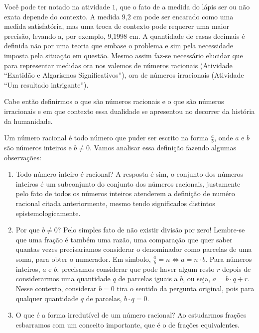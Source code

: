 Você pode ter notado na atividade $1$, que o fato de a medida do lápis ser ou não exata depende do contexto. A medida $9\text{,}2$ cm pode ser encarado como uma medida satisfatória, mas uma troca de contexto pode requerer uma maior precisão, levando a, por exemplo, $9\text{,}1998$ cm. A quantidade de casas decimais é definida não por uma teoria que embase o problema e sim pela necessidade imposta pela situação em questão. Mesmo assim faz-se necessário elucidar que para representar medidas ora nos valemos de números racionais (Atividade “Exatidão e Algarismos Significativos”), ora de números irracionais (Atividade “Um resultado intrigante”).

Cabe então definirmos o que são números racionais e o que são números irracionais e em que contexto essa dualidade se apresentou no decorrer da história da humanidade.

Um número racional é todo número que puder ser escrito na forma $\displaystyle\frac{a}{b}$, onde $a$ e $b$ são números inteiros e $b \neq 0$. Vamos analisar essa definição fazendo algumas observações:
\begin{enumerate}
\item {} 
Todo número inteiro é racional? A resposta é sim, o conjunto dos números inteiros é um subconjunto do conjunto dos números racionais, justamente pelo fato de todos os números inteiros atenderem a definição de numéro racional citada anteriormente, mesmo tendo significados distintos epistemologicamente.

\item {} 
Por que $b \neq 0$?  Pelo simples fato de não existir divisão por zero! Lembre-se que uma fração é também uma razão, uma comparação que quer saber quantas vezes precisaríamos considerar o denominador como parcelas de uma soma, para obter o numerador. Em símbolo, $\displaystyle\frac{a}{b}=n \Leftrightarrow a = n \cdot b$. Para números inteiros, $a$ e $b$, precisamos considerar que pode haver algum resto $r$ depois de considerarmos uma quantidade $q$ de parcelas iguais a $b$, ou seja, $a = b \cdot q + r$. Nesse contexto, considerar $b=0$ tira o sentido da pergunta original, pois para qualquer quantidade $q$ de parcelas, $b\cdot q = 0$.

\item {} 
O que é a forma irredutível de um número racional? Ao estudarmos frações esbarramos com um conceito importante, que é o de frações equivalentes.

\end{enumerate}

